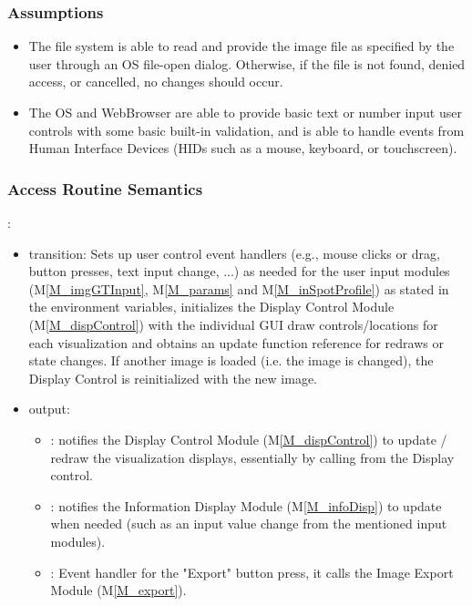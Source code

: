 \documentclass[12pt, titlepage]{article}
\newcommand{\mref}[1]{M\ref{#1}}
\newcommand{\mrefp}[1]{(\mref{#1})}
\newcommand{\mreff}[1]{Module \mrefp{#1}}
\begin{document}
\subsubsection{Assumptions}
\begin{itemize}
  \item The file system is able to read and provide the image file as specified by the user through an OS file-open dialog.
  Otherwise, if the file is not found, denied access, or cancelled, no changes should occur.
  \item The OS and WebBrowser are able to provide basic text or number input user controls with some basic built-in validation,
  and is able to handle events from Human Interface Devices (HIDs such as a mouse, keyboard, or touchscreen).
\end{itemize}

\subsubsection{Access Routine Semantics}

\noindent {}:
\begin{itemize}
  \item transition: Sets up user control event handlers (e.g., mouse clicks or drag, button presses, text input change, ...)
    as needed for the user input modules (\mref{M_imgGTInput}, \mref{M_params} and \mref{M_inSpotProfile})
    as stated in the environment variables,
    initializes the Display Control \mreff{M_dispControl}
    with the individual GUI draw controls/locations for each visualization
    and obtains an update function reference for redraws or state changes.
    If another image is loaded (i.e. the image is changed),
    the Display Control is reinitialized with the new image.
  \item output: 
    \begin{itemize}
      \item {}: notifies the Display Control \mreff{M_dispControl} to update / redraw the visualization displays,
        essentially by calling  from the Display control.
      \item {}: notifies the Information Display \mreff{M_infoDisp} to update when needed (such as
      an input value change from the mentioned input modules).
      \item {}: Event handler for the "Export" button press, it calls the Image Export \mreff{M_export}.
    \end{itemize}
\end{itemize}
\end{document}
